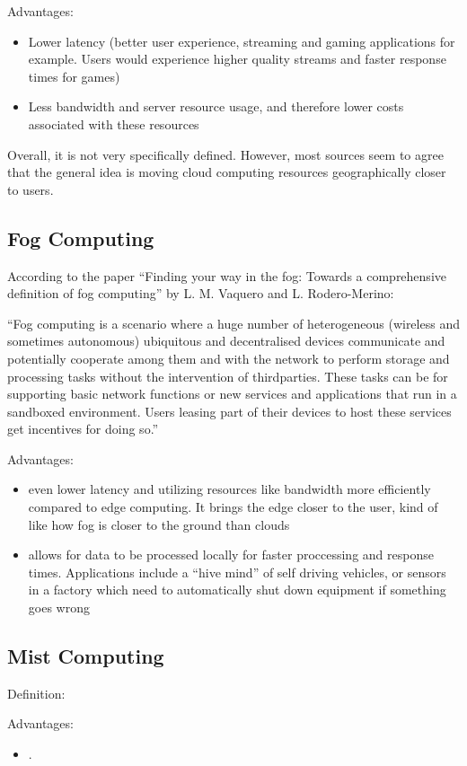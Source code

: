 Advantages:
\begin{itemize}
  \item Lower latency (better user experience, streaming and gaming applications
    for example. Users would experience higher quality streams and faster
    response times for games)
  \item Less bandwidth and server resource usage, and therefore lower costs
    associated with these resources
\end{itemize}

Overall, it is not very specifically defined. However, most sources seem to
agree that the general idea is moving cloud computing resources geographically
closer to users.

\subsection{Fog Computing}
According to the paper  “Finding your way in the
fog: Towards a comprehensive definition of fog computing” by L. M. Vaquero and
L. Rodero-Merino: 
\begin{displayquote}
  ``Fog computing is a scenario where a huge number of heterogeneous (wireless and sometimes autonomous) ubiquitous
and decentralised devices communicate and potentially cooperate among them and with the network to perform storage and processing tasks without the intervention of thirdparties. These tasks can be for supporting basic network
functions or new services and applications that run in a
sandboxed environment. Users leasing part of their devices
to host these services get incentives for doing so.''
\end{displayquote}


Advantages:
\begin{itemize}
  \item even lower latency and utilizing resources like bandwidth more
    efficiently compared to edge computing. It
    brings the edge closer to the user, kind of like how fog is closer to the
    ground than clouds
  \item allows for data to be processed locally for faster proccessing and
    response times. Applications include a ``hive mind'' of self driving
    vehicles, or sensors in a factory which need to automatically shut down
    equipment if something goes wrong
\end{itemize}

\subsection{Mist Computing}
Definition: 

Advantages:
\begin{itemize}
  \item .
\end{itemize}

